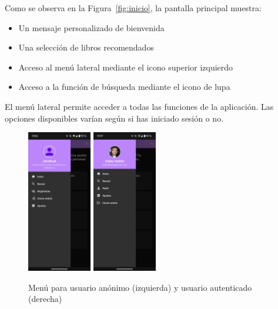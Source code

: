 \documentclass[a4paper,10pt]{report}
\begin{document}
      Como se observa en la Figura~\ref{fig:inicio}, la pantalla principal muestra:
      \begin{itemize}
        \item Un mensaje personalizado de bienvenida
        \item Una selección de libros recomendados
        \item Acceso al menú lateral mediante el icono superior izquierdo
        \item Acceso a la función de búsqueda mediante el icono de lupa
      \end{itemize} 
    
      El menú lateral permite acceder a todas las funciones de la aplicación. Las opciones disponibles varían según si has iniciado sesión o no.
      
      \begin{figure}[H]
        \centering
        \includegraphics[width=0.25\textwidth]{.img/menu.png}
        \hspace{2cm}
        \includegraphics[width=0.25\textwidth]{.img/menu-auth.png}
        \caption{Menú para usuario anónimo (izquierda) y usuario autenticado (derecha)}
        \label{fig:menu}
      \end{figure}
      
\end{document}
